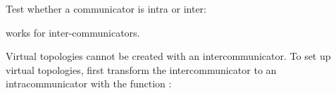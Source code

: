Test whether a communicator is intra or inter:

 works for inter-communicators.


Virtual topologies cannot be created with an intercommunicator. To set
up virtual topologies, first transform the intercommunicator to an
intracommunicator with the function
:
%
